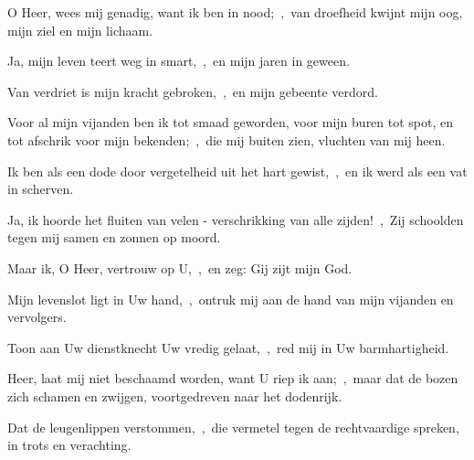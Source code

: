 \documentclass[12pt,twoside,a5paper]{article}
\begin{document}

\begin{halfparskip}
  O Heer, wees mij genadig, want ik ben in nood;~\sep\ van droefheid kwijnt mijn oog, mijn ziel en mijn lichaam.

  Ja, mijn leven teert weg in smart,~\sep\ en mijn jaren in geween.

  Van verdriet is mijn kracht gebroken,~\sep\ en mijn gebeente verdord.

  Voor al mijn vijanden ben ik tot smaad geworden, voor mijn buren tot spot, en tot afschrik voor mijn bekenden;~\sep\ die mij buiten zien, vluchten van mij heen.

  Ik ben als een dode door vergetelheid uit het hart gewist,~\sep\ en ik werd als een vat in scherven.

  Ja, ik hoorde het fluiten van velen - verschrikking van alle zijden!~\sep\ Zij schoolden tegen mij samen en zonnen op moord.
\end{halfparskip}


\begin{halfparskip}
  Maar ik, O Heer, vertrouw op U,~\sep\ en zeg: Gij zijt mijn God.

  Mijn levenslot ligt in Uw hand,~\sep\ ontruk mij aan de hand van mijn vijanden en vervolgers.

  Toon aan Uw dienstknecht Uw vredig gelaat,~\sep\ red mij in Uw barmhartigheid.

  Heer, laat mij niet beschaamd worden, want U riep ik aan;~\sep\ maar dat de bozen zich schamen en zwijgen, voortgedreven naar het dodenrijk.

  Dat de leugenlippen verstommen,~\sep\ die vermetel tegen de rechtvaardige spreken, in trots en verachting.
\end{halfparskip}

\end{document}
